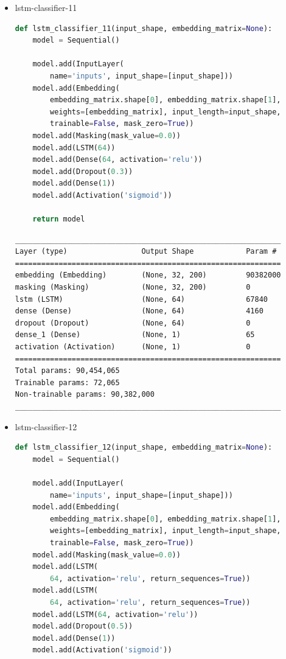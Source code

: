 \documentclass{article}
\begin{document}
\begin{itemize}
  \item lstm-classifier-11

\begin{lstlisting}[language=Python, caption=Дефиниция на lstm-classifier-11.]
def lstm_classifier_11(input_shape, embedding_matrix=None):
    model = Sequential()

    model.add(InputLayer(
        name='inputs', input_shape=[input_shape]))
    model.add(Embedding(
        embedding_matrix.shape[0], embedding_matrix.shape[1],
        weights=[embedding_matrix], input_length=input_shape,
        trainable=False, mask_zero=True))
    model.add(Masking(mask_value=0.0))
    model.add(LSTM(64))
    model.add(Dense(64, activation='relu'))
    model.add(Dropout(0.3))
    model.add(Dense(1))
    model.add(Activation('sigmoid'))

    return model
\end{lstlisting}

\begin{lstlisting}[numbers=none, caption=Обобщение на lstm-classifier-11.]
_____________________________________________________________
Layer (type)                 Output Shape            Param #
=============================================================
embedding (Embedding)        (None, 32, 200)         90382000
masking (Masking)            (None, 32, 200)         0
lstm (LSTM)                  (None, 64)              67840
dense (Dense)                (None, 64)              4160
dropout (Dropout)            (None, 64)              0
dense_1 (Dense)              (None, 1)               65
activation (Activation)      (None, 1)               0
=============================================================
Total params: 90,454,065
Trainable params: 72,065
Non-trainable params: 90,382,000
_____________________________________________________________
\end{lstlisting}

  \item lstm-classifier-12

\begin{lstlisting}[language=Python, caption=Дефиниция на lstm-classifier-12.]
def lstm_classifier_12(input_shape, embedding_matrix=None):
    model = Sequential()

    model.add(InputLayer(
        name='inputs', input_shape=[input_shape]))
    model.add(Embedding(
        embedding_matrix.shape[0], embedding_matrix.shape[1],
        weights=[embedding_matrix], input_length=input_shape,
        trainable=False, mask_zero=True))
    model.add(Masking(mask_value=0.0))
    model.add(LSTM(
        64, activation='relu', return_sequences=True))
    model.add(LSTM(
        64, activation='relu', return_sequences=True))
    model.add(LSTM(64, activation='relu'))
    model.add(Dropout(0.5))
    model.add(Dense(1))
    model.add(Activation('sigmoid'))


\end{lstlisting}
\end{itemize}
\end{document}
